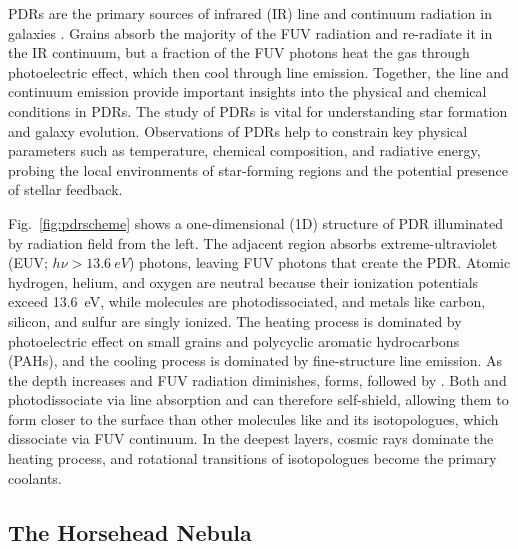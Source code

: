 \documentclass[12pt,a4paper]{article}
\begin{document}
PDRs are the primary sources of infrared (IR) line and continuum radiation in galaxies \parencite{Crawford1985,Stacey2010}. Grains absorb the majority of the FUV radiation and re-radiate it in the IR continuum, but a fraction of the FUV photons heat the gas through photoelectric effect, which then cool through line emission. Together, the line and continuum emission provide important insights into the physical and chemical conditions in PDRs. The study of PDRs is vital for understanding star formation and galaxy evolution. Observations of PDRs help to constrain key physical parameters such as temperature, chemical composition, and radiative energy, probing the local environments of star-forming regions and the potential presence of stellar feedback.

Fig.~\ref{fig:pdrscheme} shows a one-dimensional (1D) structure of PDR illuminated by radiation field from the left. The adjacent  region absorbs extreme-ultraviolet (EUV; $h\nu > \qty{13.6}{eV}$) photons, leaving FUV photons that create the PDR. Atomic hydrogen, helium, and oxygen are neutral because their ionization potentials exceed \qty{13.6}{eV}, while molecules are photodissociated, and metals like carbon, silicon, and sulfur are singly ionized. The heating process is dominated by photoelectric effect on small grains and polycyclic aromatic hydrocarbons (PAHs), and the cooling process is dominated by fine-structure line emission. As the depth increases and FUV radiation diminishes,  forms, followed by . Both  and  photodissociate via line absorption and can therefore self-shield, allowing them to form closer to the surface than other molecules like  and its isotopologues, which dissociate via FUV continuum. In the deepest layers, cosmic rays dominate the heating process, and rotational transitions of  isotopologues become the primary coolants.

\subsection{The Horsehead Nebula}
\end{document}
